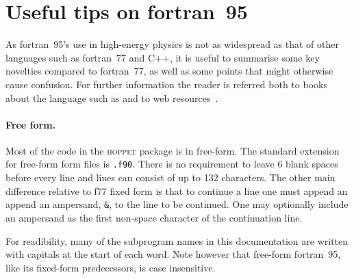 \documentclass[12pt]{article}
\newcommand{\hoppet}{\textsc{hoppet}\xspace}
\newcommand{\ttt}[1]{\texttt{#1}}
\begin{document}
\appendix

\section{Useful tips on fortran~95}
\label{sec:f95appendix}

As fortran~95's use in high-energy physics is not as widespread as
that of other languages such as fortran~77 and C++, it is useful to
summarise some key novelties compared to fortran~77, as well as some
points that might otherwise cause confusion. For further information
the reader is referred both to books about the language such as
\cite{F95Explained} and to web resources~\cite{F95WebResources}.

\paragraph{Free form.}  Most of the code in the \hoppet package is in
free-form. The standard extension for free-form form files is
\ttt{.f90}. There is no requirement to leave 6 blank spaces before
every line and lines can consist of up to 132 characters. The other
main difference relative to f77 fixed form is that to continue a line
one must append an append an ampersand, \ttt{\&}, to the line to be
continued. One may optionally include an ampersand as the first
non-space character of the continuation line.

For readibility, many of the subprogram names in this documentation
are written with capitals at the start of each word. Note however that
free-form fortran~95, like its fixed-form predecessors, is case
insensitive.
\end{document}
